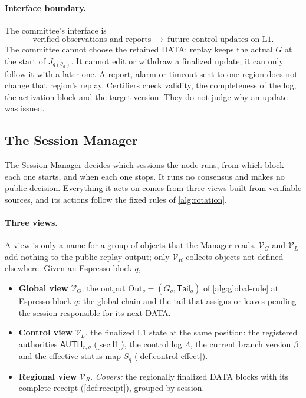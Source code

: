 \documentclass[11pt,a4paper]{article}
\newcommand{\tagg}[1]{\ensuremath{\mathsf{#1}}}
\begin{document}
\paragraph{Interface boundary.}
The committee's interface is
\[
 \text{verified observations and reports}
 \ \longrightarrow\
 \text{future control updates on L1}.
\]
The committee cannot choose the retained DATA: replay keeps the actual
$G$ at the start of $J_{q(\theta_a)}$. It cannot edit or withdraw a finalized
update; it can only follow it with a later one. A report, alarm or timeout
sent to one region does not change that region's replay. Certifiers check
validity, the completeness of the log, the activation block and the
target version. They do not judge why an update was issued.

\subsection{The Session Manager}
\label{sec:session-manager}
The Session Manager decides which sessions the node runs, from which
block each one starts, and when each one stops. It runs no consensus and
makes no public decision. Everything it acts on comes from three views
built from verifiable sources, and its actions follow the fixed rules of
\cref{alg:rotation}.

\paragraph{Three views.}
A view is only a name for a group of objects that the Manager reads.
$\mathcal V_G$ and $\mathcal V_L$ add nothing to the public replay
output; only $\mathcal V_R$ collects objects not defined elsewhere. Given an Espresso block $q$,
\begin{itemize}
\item \textbf{Global view} $\mathcal V_G$. the output
$\mathrm{Out}_q=(G_q,\mathsf{Tail}_q)$ of \cref{alg:global-rule} at Espresso
block $q$: the global chain and the tail that assigns or leaves pending
the session responsible for its next DATA.
\item \textbf{Control view} $\mathcal V_L$. the finalized
L1 state at the same position: the registered authorities
$\tagg{AUTH}_{r,g}$ (\cref{sec:l1}), the control log $\Lambda$, the
current branch version $\beta$ and the effective status map $S_q$
(\cref{def:control-effect}).
\item \textbf{Regional view} $\mathcal V_R$. \emph{Covers:} the
regionally finalized DATA blocks with its complete
receipt (\cref{def:receipt}), grouped by session. 
\end{itemize}
\end{document}
